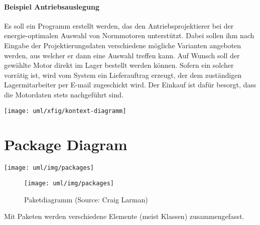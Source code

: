 \begin{minipage}[c]{0.45\linewidth}
\paragraph{Beispiel Antriebsauslegung}
 Es soll ein Programm erstellt werden, das den
Antriebsprojektierer bei der energie-optimalen
Auswahl von Normmotoren unterst\"utzt. Dabei sollen ihm
nach Eingabe der Projektierungsdaten
verschiedene m\"ogliche Varianten angeboten werden, aus welcher er dann
eine Auswahl treffen kann. Auf Wunsch soll der gew\"ahlte Motor
direkt im Lager bestellt werden k\"onnen. Sofern ein solcher
vorrätig ist, wird vom System ein Lieferauftrag erzeugt, der dem zuständigen
Lagermitarbeiter per E-mail zugeschickt wird. Der Einkauf ist dafür
besorgt, dass die Motordaten stets nachgeführt sind.\\
\vspace{1.5cm}

\texttt{[image: uml/xfig/kontext-diagramm]}
\fi
%
%
\section{Package Diagram}
\ifslides
\begin{center}
\texttt{[image: uml/img/packages]}
\end{center}
\else
\begin{figure}[H]
\texttt{[image: uml/img/packages]}
\caption{Paketdiagramm (Source: Craig Larman)}
\end{figure}
Mit Paketen werden verschiedene Elemente (meist Klassen) zusammengefasst.
\fi


\end{minipage}
